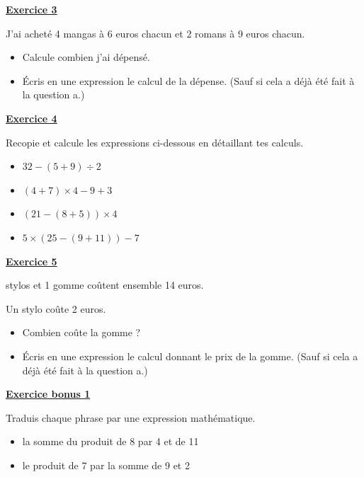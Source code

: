 \documentclass[13pt]{extarticle}
\newcommand{\exo}[1]{%
  \vspace{0.8em}%
  \noindent\large\underline{\textbf{Exercice #1}}%
  \vspace{0.2em}\par%
}
\newcommand{\exobonus}[1]{%
  \vspace{0.8em}%
  \noindent\large\underline{\textbf{Exercice bonus #1}}%
  \vspace{0.2em}\par%
}
\begin{document}
\exo{3}

\noindent J'ai acheté 4 mangas à 6 euros chacun et 2 romans à 9 euros chacun.

\begin{itemize}
  \item[a)] Calcule combien j'ai dépensé.
  \item[b)] Écris en une expression le calcul de la dépense. (Sauf si cela a déjà été fait à la question a.)
\end{itemize}

\exo{4}

\noindent Recopie et calcule les expressions ci-dessous en détaillant tes calculs.

\begin{itemize}
  \item[a)] $32 - (5 + 9) \div 2$
  \item[b)] $(4 + 7) \times 4 - 9 + 3$
  \item[c)] $(21 - (8 + 5)) \times 4$
  \item[d)] $5 \times (25 - (9 + 11)) - 7$
\end{itemize}

\newpage

\exo{5}

 stylos et 1 gomme coûtent ensemble 14 euros.

\noindent Un stylo coûte 2 euros.

\begin{itemize}
  \item[a)] Combien coûte la gomme ?
  \item[b)] Écris en une expression le calcul donnant le prix de la gomme. (Sauf si cela a déjà été fait à la question a.)
\end{itemize}

\exobonus{1}

\noindent Traduis chaque phrase par une expression mathématique.

\begin{itemize}
  \item[a)] la somme du produit de 8 par 4 et de 11
  \item[b)] le produit de 7 par la somme de 9 et 2
\end{itemize}
\end{document}
